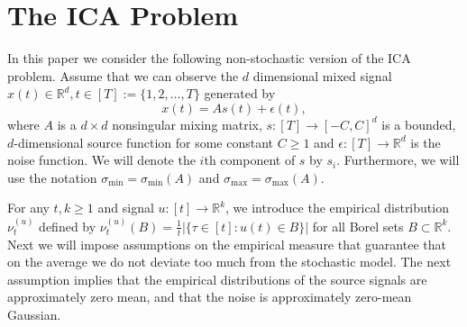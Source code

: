 \documentclass[jmlr]{article}
\newcommand{\real}{\mathbb{R}}
\newcommand{\R}{\real}
\newcommand{\iid}{i.i.d.\xspace}
\theoremstyle{definition}
\begin{document}
\section{The ICA Problem}
\label{sec:Preliminaries}
In this paper we consider the following non-stochastic version of the ICA problem.
Assume that we can observe the $d$ dimensional mixed signal $x(t) \in \R^d, t \in [T]:=\{1,2,\ldots,T\}$ generated by  
\begin{equation}
\label{eq:ICA}
x(t) = As(t)+\epsilon(t), 
\end{equation}
where $A$ is a $d\times d$ nonsingular mixing matrix,  $s:[T] \to [-C,C]^d$ is a bounded, $d$-dimensional source function for some constant $C \ge 1$ and $\epsilon:[T] \to \R^d$ is the noise function. We will denote the $i$th component of $s$ by $s_i$. 
Furthermore, we will use the notation $\sigma_{\min}=\sigma_{\min}(A)$ and
$\sigma_{\max}=\sigma_{\max}(A)$.

For any $t,k \ge 1$ and signal $u:[t] \to \R^k$, we introduce the empirical distribution $\nu_t^{(u)}$ defined by
$\nu_t^{(u)}(B)=\tfrac{1}{t}|\{\tau \in [t]: u(t) \in B\}|$ for all Borel sets $B \subset \R^k$. Next we will impose assumptions on the empirical measure that guarantee that on the average we do not deviate too much from the stochastic model. The next assumption implies that the empirical distributions of the source signals are approximately zero mean, and that the noise is approximately zero-mean Gaussian.
\end{document}
